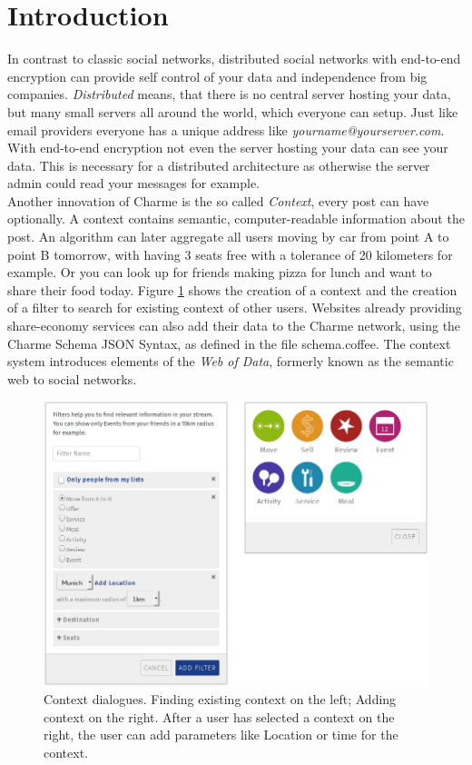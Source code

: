 \documentclass{scrartcl}
\begin{document}
\section{Introduction}
In contrast to classic social networks, distributed social networks with end-to-end encryption can provide self control of your data and  independence from big companies.  \textit{Distributed} means, that there is no central server hosting your data, but many small servers all around the world, which everyone can  setup. Just like email providers everyone has a unique address like \textit{yourname@yourserver.com}. With end-to-end encryption not even the server hosting your data can see your data. This is necessary for a distributed architecture as otherwise the server admin could read your messages for example.\\

Another innovation of Charme is the so called \textit{Context}, every post can have optionally. A context contains semantic, computer-readable information about the post.
 An algorithm can later aggregate all users moving by car from point A to point B tomorrow, with having 3 seats free with a tolerance of 20 kilometers for example. Or you can look up for friends making pizza for lunch and want to share their food today. Figure \ref{figContext} shows the creation of a context and the creation of a filter to search for existing context of other users. 
 Websites already providing share-economy services can also add their data to the Charme network, using the Charme Schema JSON Syntax, as defined in the file schema.coffee. The context system introduces elements of the \textit{Web of Data}, formerly known as the semantic web to social networks.

\begin{figure}[ht]
	\centering
  \includegraphics[width=120mm]{illustrations/context.jpg}
	\caption{Context dialogues. Finding existing context on the left; Adding context on the right. After a user has selected a context on the right, the user can add parameters like Location or time for the context.}
	\label{figContext}
\end{figure}
\end{document}

